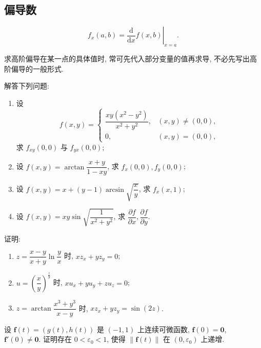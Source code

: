 \documentclass[../../数学分析培优讲义.tex]{subfiles}
\begin{document}
\subsection{偏导数}

\begin{proposition}[\markstar]
\[
    f_x(a,b)=\left.\dfrac{\mathrm{d}}{\mathrm{d}x}f(x,b)\right|_{x=a}.
\]
\end{proposition}

\begin{remark}
求高阶偏导在某一点的具体值时, 常可先代入部分变量的值再求导, 不必先写出高阶偏导的一般形式.
\end{remark}

\begin{example}
解答下列问题:
\begin{enumerate}[label=(\arabic*)]
    \item 设
    \[
        f(x,y)=
        \begin{cases}
            \dfrac{xy(x^2-y^2)}{x^2+y^2}, & (x,y)\ne(0,0),\\
            0, & (x,y)=(0,0),
        \end{cases}
    \]
    求 $f_{xy}(0,0)$ 与 $f_{yx}(0,0)$;
    \item 设 $\displaystyle f(x,y)=\arctan\dfrac{x+y}{1-xy}$, 求 $f_x(0,0),f_y(0,0)$;
    \item 设 $\displaystyle f(x,y)=x+(y-1)\arcsin\sqrt{\dfrac{x}{y}}$, 求 $f_x(x,1)$;
    \item 设 $\displaystyle f(x,y)=xy\sin\sqrt{\dfrac{1}{x^2+y^2}}$, 求 $\dfrac{\partial f}{\partial x},\dfrac{\partial f}{\partial y}$.
\end{enumerate}
\end{example}
\exampleblank

\begin{example}
证明:
\begin{enumerate}[label=(\arabic*)]
    \item $\displaystyle z=\dfrac{x-y}{x+y}\ln\dfrac{y}{x}$ 时, $xz_x+yz_y=0$;
    \item $\displaystyle u=\left(\dfrac{x}{y}\right)^{\frac{z}{y}}$ 时, $xu_x+yu_y+zu_z=0$;
    \item $\displaystyle z=\arctan\dfrac{x^3+y^3}{x-y}$ 时, $xz_x+yz_y=\sin(2z)$.
\end{enumerate}
\end{example}
\exampleblank

\begin{example}
设 $\bm f(t)=(g(t),h(t))$ 是 $(-1,1)$ 上连续可微函数, $\bm f(0)=\bm{0}$, $\bm f'(0)\ne\bm{0}$. 证明存在 $0<\varepsilon_0<1$, 使得 $\|\bm f(t)\|$ 在 $(0,\varepsilon_0)$ 上递增.
\end{example}
\exampleblank
\end{document}
